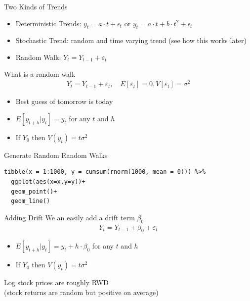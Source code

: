 \documentclass[aspectratio=169]{beamer}
\begin{document}
\begin{frame}{Two Kinds of Trends}
\begin{itemize}
\item Deterministic Trends: $y_t = a\cdot t + \epsilon_t$ or $y_t = a\cdot t + b \cdot t^2 + \epsilon_t$
\item Stochastic Trend: random and time varying trend (see how this works later)
\item Random Walk: $Y_t = Y_{t-1} + \varepsilon_t$
\end{itemize}
\end{frame}

\begin{frame}{What is a random walk}
\begin{align*}
Y_t = Y_{t-1} + \varepsilon_t, \quad E[\varepsilon_t] = 0, V[\varepsilon_t] = \sigma^2
\end{align*}
\begin{itemize}
\item Best guess of tomorrow is today
\item $E[y_{t+h} | y_t] = y_t$ for any $t$ and $h$
\item If $Y_0$ then $V(y_t) = t \sigma^2$
\end{itemize}
\end{frame}


\begin{frame}[fragile]{Generate Random Random Walks}
\begin{verbatim}
tibble(x = 1:1000, y = cumsum(rnorm(1000, mean = 0))) %>% 
  ggplot(aes(x=x,y=y))+
  geom_point()+
  geom_line()
\end{verbatim}
\end{frame}

\begin{frame}{Adding Drift}
We an easily add a drift term $\beta_0$
\begin{align*}
Y_t = Y_{t-1} + \beta_0 + \varepsilon_t
\end{align*}
\begin{itemize}
\item $E[y_{t+h} | y_t] = y_t + h\cdot \beta_0$ for any $t$ and $h$
\item If $Y_0$ then $V(y_t) = t \sigma^2$
\end{itemize}
Log stock prices are roughly RWD\\
(stock returns are random but positive on average)
\end{frame}
\end{document}
